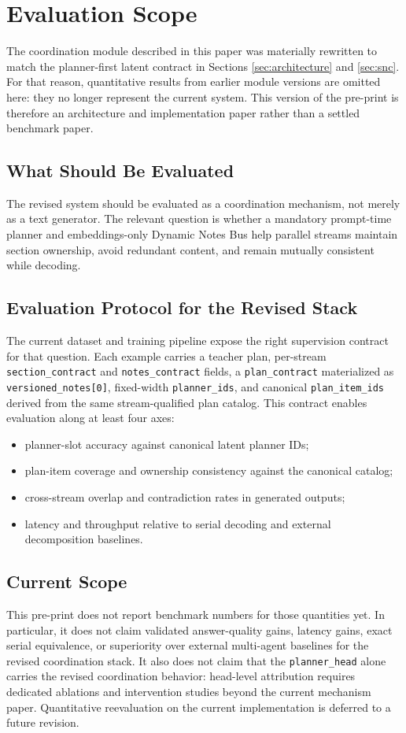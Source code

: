 \section{Evaluation Scope}
\label{sec:experiments}

The coordination module described in this paper was materially rewritten to match the planner-first latent contract in Sections \ref{sec:architecture} and \ref{sec:snc}. For that reason, quantitative results from earlier module versions are omitted here: they no longer represent the current system. This version of the pre-print is therefore an architecture and implementation paper rather than a settled benchmark paper.

\subsection{What Should Be Evaluated}
The revised system should be evaluated as a coordination mechanism, not merely as a text generator. The relevant question is whether a mandatory prompt-time planner and embeddings-only Dynamic Notes Bus help parallel streams maintain section ownership, avoid redundant content, and remain mutually consistent while decoding.

\subsection{Evaluation Protocol for the Revised Stack}
The current dataset and training pipeline expose the right supervision contract for that question. Each example carries a teacher plan, per-stream \texttt{section\_contract} and \texttt{notes\_contract} fields, a \texttt{plan\_contract} materialized as \texttt{versioned\_notes[0]}, fixed-width \texttt{planner\_ids}, and canonical \texttt{plan\_item\_ids} derived from the same stream-qualified plan catalog. This contract enables evaluation along at least four axes:
\begin{itemize}
    \item planner-slot accuracy against canonical latent planner IDs;
    \item plan-item coverage and ownership consistency against the canonical catalog;
    \item cross-stream overlap and contradiction rates in generated outputs;
    \item latency and throughput relative to serial decoding and external decomposition baselines.
\end{itemize}

\subsection{Current Scope}
This pre-print does not report benchmark numbers for those quantities yet. In particular, it does not claim validated answer-quality gains, latency gains, exact serial equivalence, or superiority over external multi-agent baselines for the revised coordination stack. It also does not claim that the \texttt{planner\_head} alone carries the revised coordination behavior: head-level attribution requires dedicated ablations and intervention studies beyond the current mechanism paper. Quantitative reevaluation on the current implementation is deferred to a future revision.
